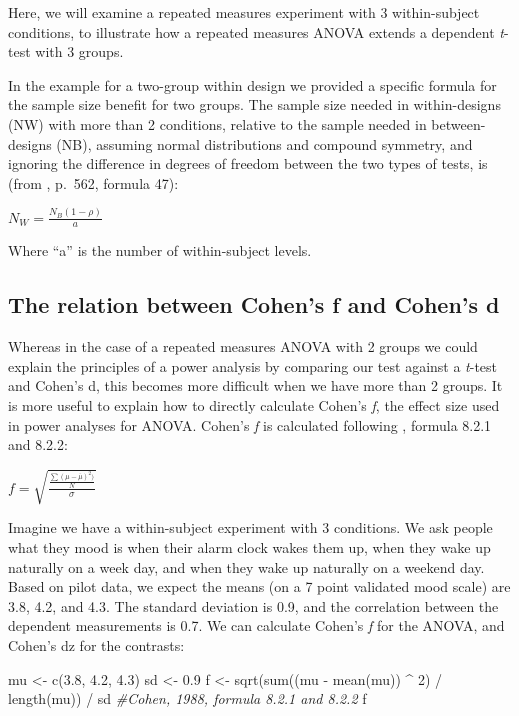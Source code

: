 \documentclass[
]{book}
\newenvironment{Shaded}{\begin{snugshade}}{\end{snugshade}}
\newcommand{\CommentTok}[1]{\textcolor[rgb]{0.56,0.35,0.01}{\textit{#1}}}
\newcommand{\DecValTok}[1]{\textcolor[rgb]{0.00,0.00,0.81}{#1}}
\newcommand{\FloatTok}[1]{\textcolor[rgb]{0.00,0.00,0.81}{#1}}
\newcommand{\FunctionTok}[1]{\textcolor[rgb]{0.00,0.00,0.00}{#1}}
\newcommand{\NormalTok}[1]{#1}
\newcommand{\OtherTok}[1]{\textcolor[rgb]{0.56,0.35,0.01}{#1}}
\newcommand{\SpecialCharTok}[1]{\textcolor[rgb]{0.00,0.00,0.00}{#1}}
\begin{document}
Here, we will examine a repeated measures experiment with 3 within-subject conditions, to illustrate how a repeated measures ANOVA extends a dependent \emph{t}-test with 3 groups.

In the example for a two-group within design we provided a specific formula for the sample size benefit for two groups. The sample size needed in within-designs (NW) with more than 2 conditions, relative to the sample needed in between-designs (NB), assuming normal distributions and compound symmetry, and ignoring the difference in degrees of freedom between the two types of tests, is (from \citet{maxwell_designing_2004}, p.~562, formula 47):

\(N_{W}=\frac{N_{B}(1-\rho)}{a}\)

Where ``a'' is the number of within-subject levels.

\hypertarget{the-relation-between-cohens-f-and-cohens-d}{%
\subsection{The relation between Cohen's f and Cohen's d}\label{the-relation-between-cohens-f-and-cohens-d}}

Whereas in the case of a repeated measures ANOVA with 2 groups we could explain the principles of a power analysis by comparing our test against a \emph{t}-test and Cohen's d, this becomes more difficult when we have more than 2 groups. It is more useful to explain how to directly calculate Cohen's \emph{f}, the effect size used in power analyses for ANOVA. Cohen's \emph{f} is calculated following \citet{cohen1988spa}, formula 8.2.1 and 8.2.2:

\(f = \sqrt{\frac{\frac{\sum(\mu-\overline{\mu})^2)}N}\sigma}\)

Imagine we have a within-subject experiment with 3 conditions. We ask people what they mood is when their alarm clock wakes them up, when they wake up naturally on a week day, and when they wake up naturally on a weekend day. Based on pilot data, we expect the means (on a 7 point validated mood scale) are 3.8, 4.2, and 4.3. The standard deviation is 0.9, and the correlation between the dependent measurements is 0.7. We can calculate Cohen's \emph{f} for the ANOVA, and Cohen's dz for the contrasts:

\begin{Shaded}
\begin{Highlighting}[]
\NormalTok{mu }\OtherTok{\textless{}{-}} \FunctionTok{c}\NormalTok{(}\FloatTok{3.8}\NormalTok{, }\FloatTok{4.2}\NormalTok{, }\FloatTok{4.3}\NormalTok{)}
\NormalTok{sd }\OtherTok{\textless{}{-}} \FloatTok{0.9}
\NormalTok{f }\OtherTok{\textless{}{-}} \FunctionTok{sqrt}\NormalTok{(}\FunctionTok{sum}\NormalTok{((mu }\SpecialCharTok{{-}} \FunctionTok{mean}\NormalTok{(mu)) }\SpecialCharTok{\^{}} \DecValTok{2}\NormalTok{) }\SpecialCharTok{/} \FunctionTok{length}\NormalTok{(mu)) }\SpecialCharTok{/}\NormalTok{ sd }
\CommentTok{\#Cohen, 1988, formula 8.2.1 and 8.2.2}
\NormalTok{  f}
\end{Highlighting}
\end{Shaded}
\end{document}
